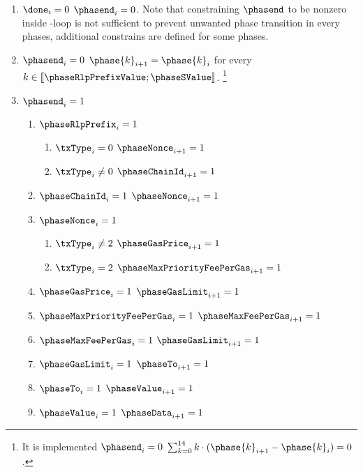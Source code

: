 \begin{enumerate}[resume]
    \item \If $\done_{i} = 0$ \Then $\phasend_{i} = 0$. Note that constraining $\phasend$ to be nonzero inside \ct -loop is not sufficient to prevent unwanted phase transition in every phases, additional constrains are defined for some phases.
    \item \If $\phasend_{i} = 0$ \Then $\phase{k}_{i + 1} = \phase{k}_{i}$ for every $k \in [\![ \phaseRlpPrefixValue ; \phaseSValue ]\!]$. \footnote{It is implemented \If $\phasend_{i} = 0$ \Then $\sum _{k = 0}^{14} k \cdot (\phase{k}_{i + 1} - \phase{k}_{i}) = 0$.}
    \item \If $\phasend_{i} = 1$ \Then
        \begin{enumerate}
            \item \If $\phaseRlpPrefix_{i} = 1$ \Then 
                \begin{enumerate}
                    \item \If $\txType_{i} = 0$ \Then $\phaseNonce_{i + 1} = 1$
                    \item \If $\txType_{i} \neq 0$ \Then $\phaseChainId_{i + 1} = 1$
                \end{enumerate}
            \item \If $\phaseChainId_{i} = 1$ \Then $\phaseNonce_{i + 1} = 1$
            \item \If $\phaseNonce_{i} = 1$ \Then 
                \begin{enumerate}
                    \item \If $\txType_{i} \neq 2$ \Then $\phaseGasPrice_{i + 1} = 1$
                    \item \If $\txType_{i} = 2$ \Then $\phaseMaxPriorityFeePerGas_{i + 1} = 1$
                \end{enumerate}
            \item \If $\phaseGasPrice_{i} = 1$ \Then $\phaseGasLimit_{i + 1} = 1$
            \item \If $\phaseMaxPriorityFeePerGas_{i} = 1$ \Then $\phaseMaxFeePerGas_{i + 1} = 1$
            \item \If $\phaseMaxFeePerGas_{i} = 1$ \Then $\phaseGasLimit_{i + 1} = 1$
            \item \If $\phaseGasLimit_{i} = 1$ \Then $\phaseTo_{i + 1} = 1$
            \item \If $\phaseTo_{i} = 1$ \Then $\phaseValue_{i + 1} = 1$
            \item \If $\phaseValue_{i} = 1$ \Then $\phaseData_{i + 1} = 1$

\end{enumerate}
\end{enumerate}

